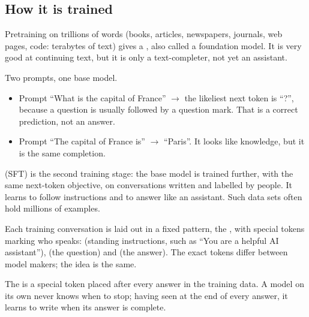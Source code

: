\subsection*{How it is trained}

\begin{definition}
Pretraining on trillions of words (books, articles, newspapers, journals, web pages, code: terabytes of text) gives a , also called a foundation model. It is very good at continuing text, but it is only a text-completer, not yet an assistant.
\end{definition}

\begin{example}
Two prompts, one base model.
\begin{itemize}
  \item Prompt ``What is the capital of France'' $\to$ the likeliest next token is ``?'', because a question is usually followed by a question mark. That is a correct prediction, not an answer.
  \item Prompt ``The capital of France is'' $\to$ ``Paris''. It looks like knowledge, but it is the same completion.
\end{itemize}
\end{example}

\begin{definition}
 (SFT) is the second training stage: the base model is trained further, with the same next-token objective, on conversations written and labelled by people. It learns to follow instructions and to answer like an assistant. Such data sets often hold millions of examples.
\end{definition}

\begin{definition}
Each training conversation is laid out in a fixed pattern, the , with special tokens marking who speaks:  (standing instructions, such as ``You are a helpful AI assistant''),  (the question) and  (the answer). The exact tokens differ between model makers; the idea is the same.
\end{definition}

\begin{definition}
The   is a special token placed after every answer in the training data. A model on its own never knows when to stop; having seen  at the end of every answer, it learns to write  when its answer is complete.
\end{definition}

